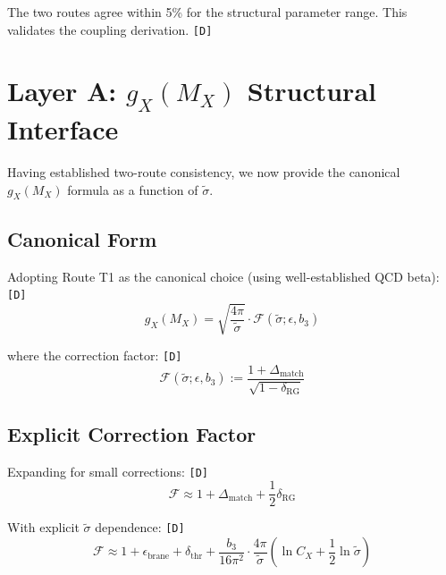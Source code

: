 \documentclass[11pt,a4paper]{article}
\newcommand{\tagD}{\textcolor{green!50!black}{\texttt{[D]}}}
\theoremstyle{definition}
\begin{document}
\begin{canonbox}
The two routes agree within 5\% for the structural parameter range.
This validates the coupling derivation. \tagD{}
\end{canonbox}

\section{Layer A: $g_X(M_X)$ Structural Interface}
\label{sec:gx-interface}

\begin{couplingbox}
Having established two-route consistency, we now provide the canonical
$g_X(M_X)$ formula as a function of $\tilde{\sigma}$.
\end{couplingbox}

\subsection{Canonical Form}
\label{subsec:canonical-form}

Adopting Route T1 as the canonical choice (using well-established QCD beta): \tagD{}
\begin{equation}
\label{eq:gx-canonical}
g_X(M_X) = \sqrt{\frac{4\pi}{\tilde{\sigma}}} \cdot \mathcal{F}(\tilde{\sigma}; \epsilon, b_3)
\end{equation}

where the correction factor: \tagD{}
\begin{equation}
\label{eq:correction-factor-F}
\mathcal{F}(\tilde{\sigma}; \epsilon, b_3) := \frac{1 + \Delta_{\text{match}}}{\sqrt{1 - \delta_{\text{RG}}}}
\end{equation}

\subsection{Explicit Correction Factor}
\label{subsec:explicit-correction}

Expanding for small corrections: \tagD{}
\begin{equation}
\label{eq:F-expanded}
\mathcal{F} \approx 1 + \Delta_{\text{match}} + \frac{1}{2}\delta_{\text{RG}}
\end{equation}

With explicit $\tilde{\sigma}$ dependence: \tagD{}
\begin{equation}
\label{eq:F-explicit-sigma}
\mathcal{F} \approx 1 + \epsilon_{\text{brane}} + \delta_{\text{thr}} + \frac{b_3}{16\pi^2} \cdot \frac{4\pi}{\tilde{\sigma}} \left(\ln C_X + \frac{1}{2}\ln\tilde{\sigma}\right)
\end{equation}
\end{document}
